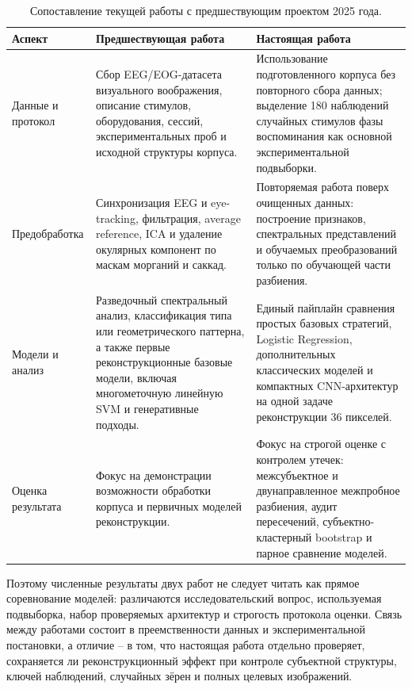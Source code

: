 \begin{table}[!t]
  \centering
  \small
  \setlength{\tabcolsep}{3pt}
  \renewcommand{\arraystretch}{1.15}
  \caption{Сопоставление текущей работы с предшествующим проектом 2025 года.}
  \label{tab:predecessor-comparison}
  \begin{tabularx}{\textwidth}{|L{31mm}|Y|Y|}
    \hline
    Аспект & Предшествующая работа & Настоящая работа \\
    \hline
    Данные и протокол &
    Сбор EEG/EOG-датасета визуального воображения, описание стимулов,
    оборудования, сессий, экспериментальных проб и исходной структуры корпуса. &
    Использование подготовленного корпуса без повторного сбора данных;
    выделение 180 наблюдений случайных стимулов фазы воспоминания как основной
    экспериментальной подвыборки. \\
    \hline
    Предобработка &
    Синхронизация EEG и eye-tracking, фильтрация, average reference, ICA и
    удаление окулярных компонент по маскам морганий и саккад. &
    Повторяемая работа поверх очищенных данных: построение признаков,
    спектральных представлений и обучаемых преобразований только по
    обучающей части разбиения. \\
    \hline
    Модели и анализ &
    Разведочный спектральный анализ, классификация типа или геометрического
    паттерна, а также первые реконструкционные базовые модели, включая
    многометочную линейную SVM и генеративные подходы. &
    Единый пайплайн сравнения простых базовых стратегий, Logistic Regression,
    дополнительных классических моделей и компактных CNN-архитектур на одной
    задаче реконструкции 36 пикселей. \\
    \hline
    Оценка результата &
    Фокус на демонстрации возможности обработки корпуса и первичных моделей
    реконструкции. &
    Фокус на строгой оценке с контролем утечек: межсубъектное и
    двунаправленное межпробное разбиения, аудит пересечений,
    субъектно-кластерный bootstrap и парное сравнение моделей. \\
    \hline
  \end{tabularx}
\end{table}

Поэтому численные результаты двух работ не следует читать как прямое
соревнование моделей: различаются исследовательский вопрос, используемая
подвыборка, набор проверяемых архитектур и строгость протокола оценки. Связь
между работами состоит в преемственности данных и экспериментальной
постановки, а отличие -- в том, что настоящая работа отдельно проверяет,
сохраняется ли реконструкционный эффект при контроле субъектной структуры,
ключей наблюдений, случайных зёрен и полных целевых изображений.

